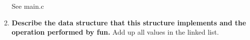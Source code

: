 \documentclass{article}
\begin{document}
\begin{enumerate}[label=\textbf{\Alph*.}]
	See main.c
	\item \textbf{Describe the data structure that this structure implements and the
	operation performed by fun.}
	Add up all values in the linked list.
\end{enumerate}
\end{document}
